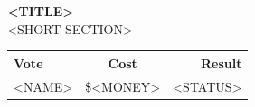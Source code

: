 \documentclass[9pt]{extarticle}
\begin{document}
\begin{minipage}[t]{.35\linewidth}
\begin{mdframed}[style=sidebar,frametitle={}]
\textbf{<TITLE>} \\
<SHORT SECTION>
\\


\begin{tabular}{lcr}

Vote & Cost & Result \\
\midrule
<NAME> & \$<MONEY> & <STATUS> \\
\bottomrule
\end{tabular}


\end{mdframed}
\end{minipage}\hfill %
%
%
\end{document}
